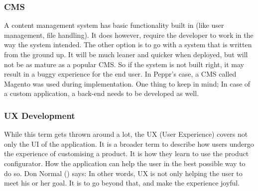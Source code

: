 \subsubsection{CMS}
A content management system has basic functionality built in (like user management, file handling). It does however, require  the developer to work in the way the system intended. The other option is to go with a system that is written from the ground up. It will be much leaner and quicker when deployed, but will not be as mature as a popular CMS. So if the system is not built right, it may result in a buggy experience for the end user. In Peppr's case, a CMS called Magento was used during implementation. One thing to keep in mind; In case of a custom application, a back-end needs to be developed as well.
\subsubsection{UX Development}
While this term gets thrown around a lot, the UX (User Experience) covers not only the UI of the application. It is a broader term to describe how users undergo the experience of customising a product. It is how they learn to use the product configurator. How the application can help the user in the best possible way to do so. Don Normal (\cite{userExperience}) says: \newline
{} \newline
In other words, UX is not only helping the user to meet his or her goal. It is to go beyond that, and make the experience joyful.


